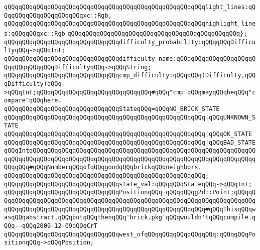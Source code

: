 \verb|qQQqqQQqqQQqqQQqqQQqqQQqqQQqqQQqqQQqqQQqqQQqqQQqqQQqqQQqlight_lines:qQQqqQQqqQQqqQQqqQQqqQQqxc::Rgb,|\newline
\verb|qQQqqQQqqQQqqQQqqQQqqQQqqQQqqQQqqQQqqQQqqQQqqQQqqQQqqQQqhighlight_lines:qQQqqQQqxc::Rgb|\newline
\verb|qQQqqQQqqQQqqQQqqQQqqQQqqQQqqQQqqQQqqQQqqQQqqQQq};|\newline
\newline
\verb|qQQqqQQqqQQqqQQqqQQqqQQqqQQqqQQqdifficulty_probability:qQQqqQQqDifficultyqQQq->qQQqInt;|\newline
\verb|qQQqqQQqqQQqqQQqqQQqqQQqqQQqqQQqdifficulty_name:qQQqqQQqqQQqqQQqqQQqqQQqqQQqqQQqqQQqDifficultyqQQq->qQQqString;|\newline
\newline
\verb|qQQqqQQqqQQqqQQqqQQqqQQqqQQqqQQqcmp_difficulty:qQQqqQQq(Difficulty,qQQqDifficulty)qQQq->qQQqInt;qQQqqQQqqQQqqQQqqQQqqQQqqQQqqQQq#qQQq"cmp"qQQqmayqQQqbeqQQq"compare"qQQqhere.|\newline
\newline
\verb|qQQqqQQqqQQqqQQqqQQqqQQqqQQqqQQqStateqQQq=qQQqNO_BRICK_STATE|\newline
\verb|qQQqqQQqqQQqqQQqqQQqqQQqqQQqqQQqqQQqqQQqqQQqqQQqqQQqqQQq|\verb#|qQQqUNKNOWN_STATE#\newline
\verb|qQQqqQQqqQQqqQQqqQQqqQQqqQQqqQQqqQQqqQQqqQQqqQQqqQQqqQQq|\verb#|qQQqOK_STATE#\newline
\verb|qQQqqQQqqQQqqQQqqQQqqQQqqQQqqQQqqQQqqQQqqQQqqQQqqQQqqQQq|\verb#|qQQqBAD_STATEqQQqIntqQQqqQQqqQQqqQQqqQQqqQQqqQQqqQQqqQQqqQQqqQQqqQQqqQQqqQQqqQQqqQQqqQQqqQQqqQQqqQQqqQQqqQQqqQQqqQQqqQQqqQQqqQQqqQQqqQQqqQQqqQQqqQQqqQQqqQQqqQQq#\verb|#qQQqNumberqQQqofqQQqgoodqQQqbrickqQQqneighbors.|\newline
\verb|qQQqqQQqqQQqqQQqqQQqqQQqqQQqqQQqqQQqqQQqqQQqqQQqqQQqqQQq;|\newline
\newline
\verb|qQQqqQQqqQQqqQQqqQQqqQQqqQQqqQQqstate_val:qQQqqQQqStateqQQq->qQQqInt;|\newline
\newline
\verb|qQQqqQQqqQQqqQQqqQQqqQQqqQQqqQQqPositionqQQq=qQQqqQQqg2d::Point;qQQqqQQqqQQqqQQqqQQqqQQqqQQqqQQqqQQqqQQqqQQqqQQqqQQqqQQqqQQqqQQqqQQqqQQqqQQqqQQqqQQqqQQqqQQqqQQqqQQqqQQqqQQqqQQqqQQqqQQqqQQqqQQqqQQq#qQQqThisqQQqwasqQQqabstract,qQQqbutqQQqthenqQQq'brick.pkg'qQQqwouldn'tqQQqcompile.qQQq--qQQq2009-12-09qQQqCrT|\newline
\newline
\verb|qQQqqQQqqQQqqQQqqQQqqQQqqQQqqQQqwest_ofqQQqqQQqqQQqqQQqqQQq:qQQqqQQqPositionqQQq->qQQqPosition;|\newline
